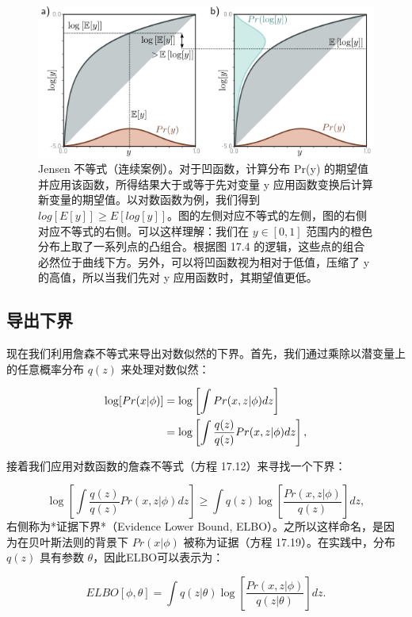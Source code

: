 \begin{figure}[ht!]
\centering
\includegraphics[width=0.7\linewidth]{png/chapter17/VAEJensen.png}
\caption{Jensen 不等式（连续案例）。对于凹函数，计算分布 Pr(y) 的期望值并应用该函数，所得结果大于或等于先对变量 y 应用函数变换后计算新变量的期望值。以对数函数为例，我们得到 \(log[E[y]] \geq E[log[y]]\)。图的左侧对应不等式的左侧，图的右侧对应不等式的右侧。可以这样理解：我们在 \(y \in [0, 1]\) 范围内的橙色分布上取了一系列点的凸组合。根据图 17.4 的逻辑，这些点的组合必然位于曲线下方。另外，可以将凹函数视为相对于低值，压缩了 y 的高值，所以当我们先对 y 应用函数时，其期望值更低。}
\end{figure}


\subsection{导出下界}

现在我们利用詹森不等式来导出对数似然的下界。首先，我们通过乘除以潜变量上的任意概率分布 \(q(z)\) 来处理对数似然：


\begin{align}
\log[Pr(x|\phi)] &= \log \left[ \int Pr(x, z|\phi) dz \right] \notag \\
&= \log \left[ \int \frac{q(z)}{q(z)} Pr(x, z|\phi) dz \right], 
\end{align} 


接着我们应用对数函数的詹森不等式（方程 17.12）来寻找一个下界：

\begin{equation}
\log \left[ \int \frac{q(z)}{q(z)} Pr(x, z|\phi) dz \right] \geq \int q(z) \log \left[ \frac{Pr(x, z|\phi)}{q(z)} \right] dz, 
\end{equation}
右侧称为*证据下界*（Evidence Lower Bound, ELBO）。之所以这样命名，是因为在贝叶斯法则的背景下 \(Pr(x|\phi)\) 被称为证据（方程 17.19）。在实践中，分布 \(q(z)\) 具有参数 \(\theta\)，因此ELBO可以表示为：

\begin{equation}
ELBO[\phi, \theta] = \int q(z|\theta) \log \left[ \frac{Pr(x, z|\phi)}{q(z|\theta)} \right] dz. 
\end{equation}


